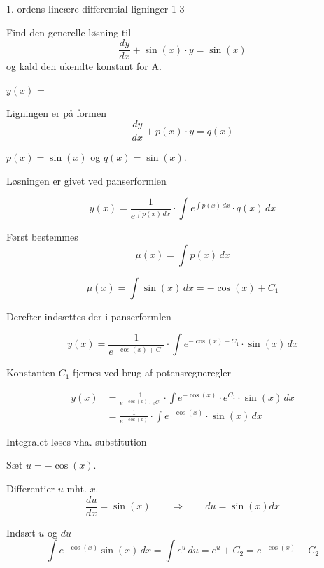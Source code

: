 \documentclass{article}
\begin{document}
\begin{exercise}{1. ordens lineære differential ligninger 1-3}
	
	
	Find den generelle løsning til
	\[
	\frac{dy}{dx} + \sin(x) \cdot y = \sin(x)
	\]
	og kald den ukendte konstant for A.
	
	$y(x)$ =  \\
	
	
	
	\hint
	
	Ligningen er på formen
	\[
	\frac{dy}{dx} + p(x) \cdot y = q(x)
	\]
	
	\hint
	
	$p(x)=\sin(x)$ og $q(x)=\sin(x)$.
	
	\hint
	
	Løsningen er givet ved panserformlen
	
	
	\hint
	
	\[
	y(x) = \frac{1}{e^{\int p(x) \, dx}} \cdot \int e^{\int p(x) \, dx}  \cdot q(x) \, dx
	\]
	
	\hint
	
	Først bestemmes 
	\[
	\mu(x) = \int p(x) \, dx
	\]
	
	\hint
	\[
	\mu(x) = \int \sin(x) \, dx = -\cos(x) + C_1
	\]
	
	\hint
	Derefter indsættes der i  panserformlen
	
	\hint
	
	\[
	y(x) = \frac{1}{e^{-\cos(x) + C_1}} \cdot \int e^{-\cos(x) + C_1}  \cdot \sin(x) \, dx
	\]
	
	
	\hint
	
	Konstanten $C_1$ fjernes ved brug af potensregneregler
	
	\hint
	\begin{align*}
	y(x) &= \frac{1}{e^{- \cos(x)} \cdot e^{C_1}} \cdot \int e^{-\cos(x)} \cdot e^{C_1}  \cdot \sin(x) \, dx  \\
	&= \frac{1}{e^{-\cos(x)}} \cdot \int e^{- \cos(x)}  \cdot \sin(x) \, dx
	\end{align*}
	
	\hint
	
	Integralet løses vha. substitution
	
	
	\hint
	Sæt $u = - \cos(x)$.
	
	\hint
	
	Differentier $u$ mht. $x$.
	\[
	\frac{du}{dx} = \sin(x) \qquad	\Rightarrow \qquad du = \sin(x) dx
	\]
	
	\hint 
	Indsæt $u$ og $du$
	\[
	\int e^{- \cos(x)} \sin(x) \, dx = \int e^{u} \, du = e^{u} + C_2 = e^{- \cos(x)} + C_2
	\]
	

\end{exercise}
\end{document}
